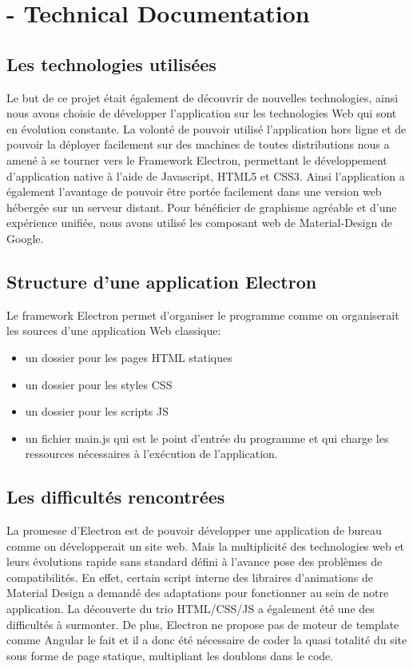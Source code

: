 \documentclass{scrreprt}
\begin{document}
{\let\clearpage\relax \chapter{- Technical Documentation}}

\section{Les technologies utilisées}
Le but de ce projet était également de découvrir de nouvelles technologies, ainsi nous avons choisie de développer l'application
sur les technologies Web qui sont en évolution constante. La volonté de pouvoir utilisé l'application hors ligne et de pouvoir
la déployer facilement sur des machines de toutes distributions nous a amené à se tourner vers le Framework Electron, permettant
le développement d'application native à l'aide de Javascript, HTML5 et CSS3. Ainsi l'application a également l'avantage de pouvoir être portée
facilement dans une version web hébergée sur un serveur distant. Pour bénéficier de graphisme agréable et d'une expérience unifiée, nous avons
utilisé les composant web de Material-Design de Google.

\section{Structure d'une application Electron}
Le framework Electron permet d'organiser le programme comme on organiserait les sources d'une application Web classique:
\begin{itemize}
\item un dossier pour les pages HTML statiques
\item un dossier pour les styles CSS
\item un dossier pour les scripts JS
\item un fichier main.js qui est le point d'entrée du programme et qui charge les ressources nécessaires à l'exécution de l'application.
\end{itemize}

\section{Les difficultés rencontrées}
La promesse d'Electron est de pouvoir développer une application de bureau comme on développerait un site web. Mais la multiplicité des
technologies web et leurs évolutions rapide sans standard défini à l'avance pose des problèmes de compatibilités. En effet,
certain script interne des libraires d'animations de Material Design a demandé des adaptations pour fonctionner au sein de notre application.
La découverte du trio HTML/CSS/JS a également été une des difficultés à surmonter. De plus, Electron ne propose pas de moteur de template
comme Angular le fait et il a donc été nécessaire de coder la quasi totalité du site sous forme de page statique, multipliant les doublons dans le code.
\end{document}
